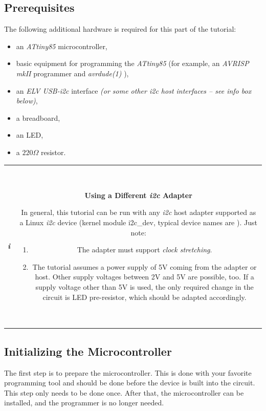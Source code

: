 \documentclass[12pt,english,parskip=half,headheight=19pt]{scrreprt}
\newcommand{\lst}[1]{\colorbox{lstbackground}{\footnotesize\code{#1}}}
\newcommand{\lstf}[1]{\colorbox{lstbackground}{\ttfamily\footnotesize#1}}
\newcommand{\infobox}[1]{
  \par
  \medskip
  \hfill
  \setlength\arrayrulewidth{1pt}
  \begin{tabular}[t]{c|c|}
    \parbox{1.8em}{\hfill\textit{\Huge\textbf{i}\,}}
    &
    \,\parbox{0.89\linewidth}{\setlength{\parskip}{0.5em} \small #1}\,
  \end{tabular}
  \medskip
  \par
}
\begin{document}
\subsection{Prerequisites}
\label{sec:tutorial-brownies-prerequisites}

The following additional hardware is required for this part of the tutorial:
\begin{itemize}
  \item an \textit{ATtiny85} microcontroller,
  \item basic equipment for programming the \textit{ATtiny85}
        (for example, an \textit{AVRISP mkII} programmer and \textit{avrdude(1)} ),
  \item an \textit{ELV USB-i2c} interface
        \textit{(or some other \textit{i2c} host interfaces -- see info box below)},
  \item a breadboard,
  \item an LED,
  \item a $220\Omega$ resistor.
\end{itemize}

\infobox{
  \textbf{Using a Different \textit{i2c} Adapter}

  In general, this tutorial can be run with any \textit{i2c} host adapter supported as a Linux
  \textit{i2c} device (kernel module \lstf{i2c\_dev}, typical device names are \lst{/dev/i2c-*}).
  Just note:
  \begin{enumerate}
    \item The adapter must support \textit{clock stretching}.
    \item The tutorial assumes a power supply of 5V coming from the adapter or host. Other supply voltages
          between 2V and 5V are possible, too. If a supply voltage other than 5V is used, the only
          required change in the circuit is LED pre-resistor, which should be adapted accordingly.
  \end{enumerate}
}



\subsection{Initializing the Microcontroller}
\label{sec:tutorial-brownies-init}

The first step is to prepare the microcontroller. This is done with your favorite programming tool and should be done before the device is built into the circuit. This step only needs to be done once. After that, the microcontroller can be installed, and the programmer is no longer needed.
\end{document}
